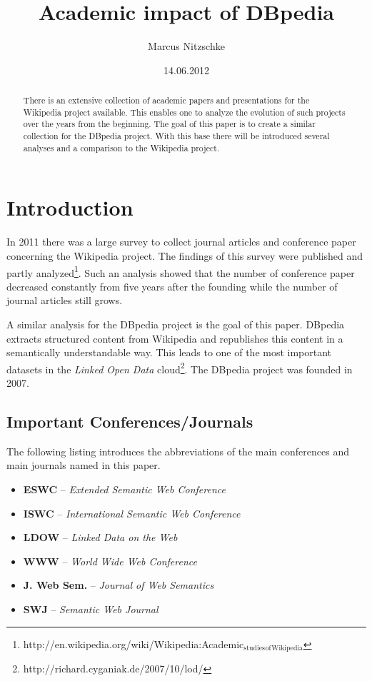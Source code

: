\documentclass[english]{lni}
\title{Academic impact of DBpedia}
\author{Marcus Nitzschke}
\date{14.06.2012}
\begin{document}
\maketitle


\begin{abstract} 
There is an extensive collection of academic papers and presentations for the
Wikipedia project available. This enables one to analyze the evolution of such
projects over the years from the beginning. The goal of this paper is to create a
similar collection for the DBpedia project. With this base there will be
introduced several analyses and a comparison to the Wikipedia project.
\end{abstract}

\section{Introduction}
\label{sec-1}

  In 2011 there was a large survey to collect journal articles and conference
  paper concerning the Wikipedia project. The findings of this survey were published
  and partly analyzed\footnote{http://en.wikipedia.org/wiki/Wikipedia:Academic$_{\mathrm{studies}}$$_{\mathrm{of}}$$_{\mathrm{Wikipedia}}$ }. Such an analysis showed that the number of
  conference paper decreased constantly from five years after the founding
  while the number of journal articles still grows.

  A similar analysis for the DBpedia project is the goal of this paper. DBpedia
  extracts structured content from Wikipedia and republishes this content in a
  semantically understandable way. This leads to one of the most important datasets in the
  \emph{Linked Open Data} cloud\footnote{http://richard.cyganiak.de/2007/10/lod/ }. The DBpedia project was founded in 2007.
\subsection{Important Conferences/Journals}
\label{sec-1-1}

  The following listing introduces the abbreviations of the main conferences and
  main journals named in this paper.
\begin{itemize}
\item \textbf{ESWC} -- \emph{Extended Semantic Web Conference}
\item \textbf{ISWC} -- \emph{International Semantic Web Conference}
\item \textbf{LDOW} -- \emph{Linked Data on the Web}
\item \textbf{WWW} -- \emph{World Wide Web Conference}
\item \textbf{J. Web Sem.} -- \emph{Journal of Web Semantics}
\item \textbf{SWJ} -- \emph{Semantic Web Journal}
\end{itemize}
\end{document}
